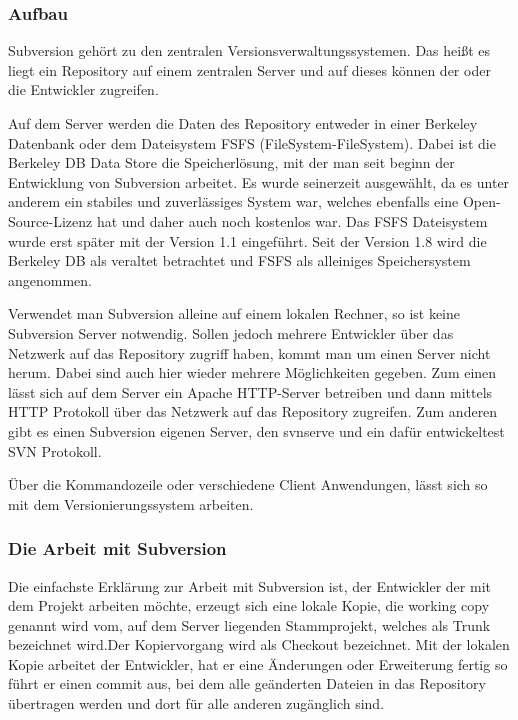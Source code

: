 \subsubsection{Aufbau}
Subversion gehört zu den zentralen Versionsverwaltungssystemen. Das heißt es liegt ein Repository auf einem zentralen Server und auf dieses können der oder die Entwickler zugreifen.

Auf dem Server werden die Daten des Repository entweder in einer Berkeley Datenbank oder dem Dateisystem FSFS (FileSystem-FileSystem). Dabei ist die Berkeley DB Data Store die Speicherlösung, mit der man seit beginn der Entwicklung von Subversion arbeitet. Es wurde seinerzeit ausgewählt, da es unter anderem ein stabiles und zuverlässiges System war, welches ebenfalls eine Open-Source-Lizenz hat und daher auch noch kostenlos war. Das FSFS Dateisystem wurde erst später mit der Version 1.1 eingeführt. Seit der Version 1.8 wird die Berkeley DB als veraltet betrachtet und FSFS als alleiniges Speichersystem angenommen. 

Verwendet man Subversion alleine auf einem lokalen Rechner, so ist keine Subversion Server notwendig. Sollen jedoch mehrere Entwickler über das Netzwerk auf das Repository zugriff haben, kommt man um einen Server nicht herum. Dabei sind auch hier wieder mehrere Möglichkeiten gegeben. Zum einen lässt sich auf dem Server ein Apache HTTP-Server betreiben und dann mittels HTTP Protokoll über das Netzwerk auf das Repository zugreifen. Zum anderen gibt es einen Subversion eigenen Server, den svnserve und ein dafür entwickeltest SVN Protokoll. 

Über die Kommandozeile oder verschiedene Client Anwendungen, lässt sich so mit dem Versionierungssystem arbeiten. 

\subsubsection{Die Arbeit mit Subversion}

Die einfachste Erklärung zur Arbeit mit Subversion ist, der Entwickler der mit dem Projekt arbeiten möchte, erzeugt sich eine lokale Kopie, die working copy genannt wird vom, auf dem Server liegenden Stammprojekt, welches als Trunk bezeichnet wird.Der Kopiervorgang wird als Checkout bezeichnet. Mit der lokalen Kopie arbeitet der Entwickler, hat er eine Änderungen oder Erweiterung fertig so führt er einen commit aus, bei dem alle geänderten Dateien in das Repository übertragen werden und dort für alle anderen zugänglich sind. 

